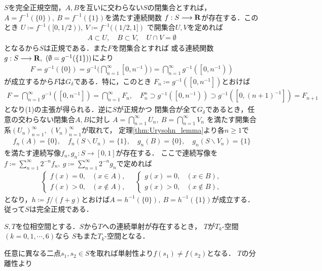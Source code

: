 	\begin{prf}
		$S$を完全正規空間，$A,B$を互いに交わらない$S$の閉集合とすれば，
		$A=f^{-1}(\{0\}),\ B = f^{-1}(\{1\})$を満たす連続関数
		$f:S \longrightarrow \mathbf{R}$が存在する．このとき
		$U \coloneqq f^{-1}([0,1/2)),\ V \coloneqq f^{-1}((1/2,1])$
		で開集合$U,V$を定めれば
		\begin{align}
			A \subset U,\quad B \subset V,\quad U \cap V = \emptyset
		\end{align}
		となるから$S$は正規である．また$F$を閉集合とすれば
		或る連続関数$g:S \longrightarrow \R,\ (\emptyset = g^{-1}(\{1\}))$により
		\begin{align}
			F = g^{-1}(\{0\}) 
			= g^{-1}\Biggl(\bigcap_{n=1}^\infty\left[0,n^{-1}\right)\Biggr)
			= \bigcap_{n=1}^\infty g^{-1}\left(\left[0,n^{-1}\right)\right)
		\end{align}
		が成立するから$F$は$G_\delta$である．特に，このとき
		$F_n \coloneqq g^{-1}\left(\left[0,n^{-1}\right]\right)$とおけば
		\begin{align}
			F = \bigcap_{n=1}^\infty g^{-1}\left(\left[0,n^{-1}\right]\right)
			= \bigcap_{n=1}^\infty F_n,
			\quad F_n^{\mathrm{o}} \supset g^{-1}\left(\left[0,n^{-1}\right)\right)
			\supset g^{-1}\left(\left[0,(n+1)^{-1}\right]\right)
			= F_{n+1}
		\end{align}
		となり(1)の主張が得られる．逆に$S$が正規かつ
		閉集合が全て$G_\delta$であるとき，任意の交わらない閉集合$A,B$に対し
		$A = \bigcap_{n=1}^\infty U_n,\ B = \bigcap_{n=1}^\infty V_n$
		を満たす開集合系$(U_n)_{n=1}^\infty,\ (V_n)_{n=1}^\infty$が取れて，
		定理\ref{thm:Urysohn_lemma}より各$n \geq 1$で
		\begin{align}
			f_n(A) = \{0\},\quad f_n(S \backslash U_n) = \{1\},
			\quad g_n(B) = \{0\},\quad g_n(S \backslash V_n) = \{1\}
		\end{align}
		を満たす連続写像$f_n,g_n:S \longrightarrow [0,1]$が存在する．
		ここで連続写像を$f \coloneqq \sum_{n=1}^\infty 2^{-n} f_n,\ 
		g \coloneqq \sum_{n=1}^\infty 2^{-n} g_n$で定めれば
		\begin{align}
			\begin{cases}
				f(x) = 0, & (x \in A), \\
				f(x) > 0, & (x \notin A),
			\end{cases}
			\quad \begin{cases}
				g(x) = 0, & (x \in B), \\
				g(x) > 0, & (x \notin B),
			\end{cases}
		\end{align}
		となり，$h \coloneqq f/(f+g)$とおけば$A = h^{-1}(\{0\}),\ B = h^{-1}(\{1\})$が成立する．
		従って$S$は完全正規である．
		\QED
	\end{prf}
	
	\begin{screen}
		\begin{thm}[連続な単射の引き戻しによる分離性の遺伝]
			$S,T$を位相空間とする．$S$から$T$への連続単射が存在するとき，
			$T$が$T_k$-空間$(k=0,1,\cdots,6)$なら
			$S$もまた$T_k$-空間となる．
		\end{thm}
	\end{screen}
	
	\begin{prf}
		任意に異なる二点$s_1,s_2 \in S$を取れば単射性より$f(s_1) \neq f(s_2)$となる．
		$T$の分離性より
	\end{prf}
